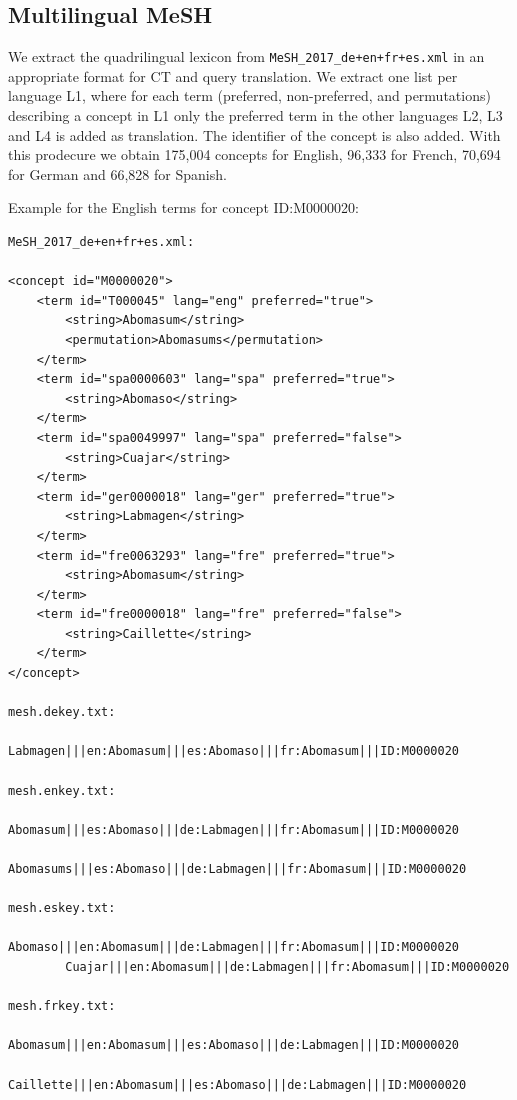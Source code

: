 \documentclass[a4paper,11pt]{article}
\begin{document}
\subsection{Multilingual MeSH}
\label{ss:meshLex}

We extract the quadrilingual lexicon from {\tt MeSH\_2017\_de+en+fr+es.xml} in an appropriate format for CT and  query translation. We extract one list per language L1, where for each term (preferred, non-preferred, and permutations) describing a concept in L1 only the preferred term in the other languages L2, L3 and L4 is added as translation. The identifier of the concept is also added. With this prodecure we obtain 175,004 concepts for English, 96,333 for French, 70,694 for German and 66,828 for Spanish.

\bigskip
\noindent Example for the English terms for concept ID:M0000020: 

{\small 
\begin{verbatim}
MeSH_2017_de+en+fr+es.xml:
 
<concept id="M0000020">
	<term id="T000045" lang="eng" preferred="true">
		<string>Abomasum</string>
		<permutation>Abomasums</permutation>
	</term>
	<term id="spa0000603" lang="spa" preferred="true">
		<string>Abomaso</string>
	</term>
	<term id="spa0049997" lang="spa" preferred="false">
		<string>Cuajar</string>
	</term>
	<term id="ger0000018" lang="ger" preferred="true">
		<string>Labmagen</string>
	</term>
	<term id="fre0063293" lang="fre" preferred="true">
		<string>Abomasum</string>
	</term>
	<term id="fre0000018" lang="fre" preferred="false">
		<string>Caillette</string>
	</term>
</concept>

mesh.dekey.txt:
        Labmagen|||en:Abomasum|||es:Abomaso|||fr:Abomasum|||ID:M0000020
  
mesh.enkey.txt:
        Abomasum|||es:Abomaso|||de:Labmagen|||fr:Abomasum|||ID:M0000020
        Abomasums|||es:Abomaso|||de:Labmagen|||fr:Abomasum|||ID:M0000020
        
mesh.eskey.txt:       
        Abomaso|||en:Abomasum|||de:Labmagen|||fr:Abomasum|||ID:M0000020
        Cuajar|||en:Abomasum|||de:Labmagen|||fr:Abomasum|||ID:M0000020

mesh.frkey.txt:  
        Abomasum|||en:Abomasum|||es:Abomaso|||de:Labmagen|||ID:M0000020
        Caillette|||en:Abomasum|||es:Abomaso|||de:Labmagen|||ID:M0000020
\end{verbatim}
}

\end{document}
